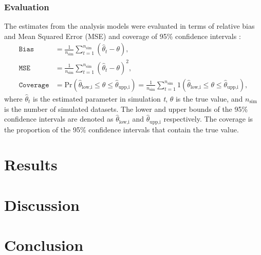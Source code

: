\documentclass[10pt, a4paper, titlepage]{article}
\begin{document}
\subsubsection{Evaluation}
The estimates from the analysis models were evaluated in terms of relative bias and Mean Squared Error (MSE) and coverage of 95\% confidence intervals \citep{morris2019}:
\begin{subequations}
\begin{align}
\label{eq:evaluations}
    \texttt{Bias} &= \frac{1}{n_{\text{sim}}} \sum_{t=1}^{n_{\text{sim}}} (\hat{\theta}_t - \theta), \\
    \texttt{MSE} &= \frac{1}{n_{\text{sim}}} \sum_{t=1}^{n_{\text{sim}}} (\hat{\theta}_t - \theta)^{2}, {} \\
    \texttt{Coverage} &= \text{Pr}(\hat{\theta}_{\text{low,i}} \leq \theta \leq \hat{\theta}_{\text{upp,i}}) = \frac{1}{n_{\text{sim}}} \sum_{t=1}^{n_{\text{sim}}} 1(\hat{\theta}_{\text{low,i}} \leq \theta \leq \hat{\theta}_{\text{upp,i}}),
\end{align}
\end{subequations} where $\hat{\theta}_t$ is the estimated parameter in simulation \textit{t}, $\theta$ is the true value, and $n_{\text{sim}}$ is the number of simulated datasets. The lower and upper bounds of the 95\% confidence intervals are denoted as $\hat{\theta}_{\text{low,i}}$ and $\hat{\theta}_{\text{upp,i}}$ respectively. The coverage is the proportion of the 95\% confidence intervals that contain the true value. 

\section{Results}

\section{Discussion}

\section{Conclusion}

\newpage
\end{document}
